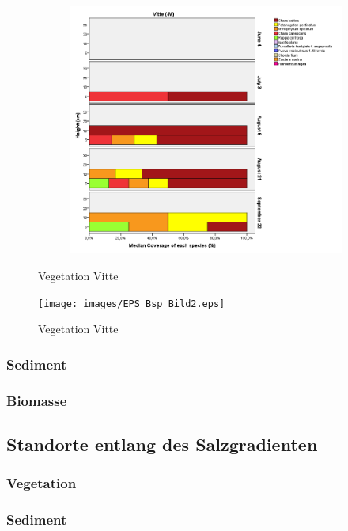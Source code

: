 \begin{figure}
\begin{subfigure}[b]{0.57\textwidth}
                \includegraphics[width=\textwidth]{images/wh_v_ohne_two}
        \end{subfigure}
        \caption{Vegetation Vitte}
        \label{fig:animals}
\end{figure}


\begin{figure}
        \centering
        	\texttt{[image: images/EPS\_Bsp\_Bild2.eps]}
        \caption{Vegetation Vitte}
        \label{fig:animals}
\end{figure}



\subsubsection{Sediment}



\subsubsection{Biomasse}







\subsection{Standorte entlang des Salzgradienten}

\subsubsection{Vegetation}

\subsubsection{Sediment}










